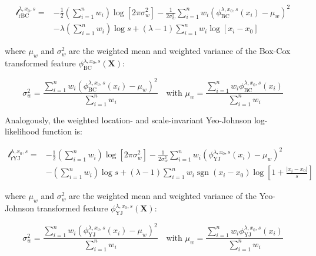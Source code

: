 \documentclass[preprint,12pt,authoryear]{elsarticle}
\DeclareMathOperator{\sgn}{sgn}
\begin{document}
\begin{equation}
\label{eqn:box-cox-weighted-invariant-log-likelihood}
\begin{split}
\mathcal{l}_{\text{rBC}}^{\lambda, x_0, s} = & -\frac{1}{2} \left(\sum_{i=1}^n w_i \right) \log \left[ 2 \pi \sigma_w^2 \right] -\frac{1}{2 \sigma_w^2} \sum_{i=1}^n w_i \left( \phi_{\text{BC}}^{\lambda, x_0, s}(x_i) - \mu_w \right)^2 \\
& - \lambda \left( \sum_{i=1}^n w_i \right) \log s + \left( \lambda - 1 \right) \sum_{i=1}^n w_i \log \left[ x_i - x_0 \right]
\end{split}
\end{equation}

where \(\mu_w\) and \(\sigma^2_w\) are the weighted mean and weighted
variance of the Box-Cox transformed feature
\(\phi_{\text{BC}}^{\lambda, x_0, s} (\mathbf{X})\):

\begin{equation}
\sigma_w^2 = \frac{\sum_{i=1}^n w_i \left(\phi_{\text{BC}}^{\lambda, x_0, s} (x_i) - \mu_w \right)^2}{\sum_{i=1}^n w_i} \quad \text{with } \mu_w = \frac{\sum_{i=1}^n w_i \phi_{\text{BC}}^{\lambda, x_0, s} (x_i)} {\sum_{i=1}^n w_i}
\end{equation}

Analogously, the weighted location- and scale-invariant Yeo-Johnson
log-likelihood function is:

\begin{equation}
\label{eqn:yeo-johnson-weighted-invariant-log-likelihood}
\begin{split}
\mathcal{l}_{\text{rYJ}}^{\lambda, x_0, s} = & -\frac{1}{2} \left(\sum_{i=1}^n w_i \right) \log \left[ 2 \pi \sigma_w^2 \right] -\frac{1}{2 \sigma_w^2} \sum_{i=1}^n w_i \left( \phi_{\text{YJ}}^{\lambda, x_0, s}(x_i) - \mu_w \right)^2 \\
& - \left( \sum_{i=1}^n w_i \right) \log s + (\lambda - 1) \sum_{i=1}^n w_i \sgn(x_i - x_0) \log \left[1 + \frac{|x_i - x_0|}{s} \right]
\end{split}
\end{equation}

where \(\mu_w\) and \(\sigma^2_w\) are the weighted mean and weighted
variance of the Yeo-Johnson transformed feature
\(\phi_{\text{YJ}}^{\lambda, x_0, s} (\mathbf{X})\):

\begin{equation}
\sigma_w^2 = \frac{\sum_{i=1}^n w_i \left(\phi_{\text{YJ}}^{\lambda, x_0, s} (x_i) - \mu_w \right)^2}{\sum_{i=1}^n w_i} \quad \text{with } \mu_w = \frac{\sum_{i=1}^n w_i \phi_{\text{YJ}}^{\lambda, x_0, s} (x_i)} {\sum_{i=1}^n w_i}
\end{equation}
\end{document}
